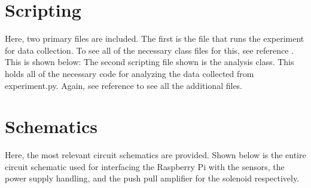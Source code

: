 \section{Scripting}\label{sec:Scripting}
Here, two primary files are included. The first is the file that runs the experiment for data collection. To see all of the necessary class files for this, see reference \cite{github}. This is shown below:
\clearpage
The second scripting file shown is the analysis class. This holds all of the necessary code for analyzing the data collected from experiment.py. Again, see reference \cite{github} to see all the additional files.
\clearpage
\section{Schematics}\label{sec:Schematics}
Here, the most relevant circuit schematics are provided. Shown below is the entire circuit schematic used for interfacing the Raspberry Pi with the sensors, the power supply handling, and the push pull amplifier for the solenoid respectively.



